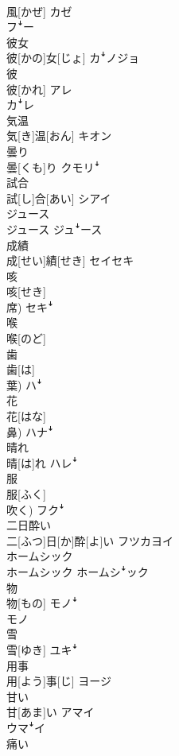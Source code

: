 \documentclass[8pt]{extreport}
\begin{document}
\begin{CJK}{UTF8}{min}
\\	風[かぜ]	カゼ 
\\	フꜜー
\\	彼女	
\\	彼[かの]女[じょ]	カꜜノジョ
\\	彼	
\\	彼[かれ]	アレ 
\\	カꜜレ
\\	気温	
\\	気[き]温[おん]	キオン
\\	曇り	
\\	曇[くも]り	クモリꜜ
\\	試合	
\\	試[し]合[あい]	シアイ
\\	ジュース	
\\	ジュース	ジュꜜース
\\	成績	
\\	成[せい]績[せき]	セイセキ
\\	咳	
\\	咳[せき] 
\\	席)	セキꜜ
\\	喉	
\\	喉[のど]	
\\	歯	
\\	歯[は] 
\\	葉)	ハꜜ
\\	花	
\\	花[はな] 
\\	鼻)	ハナꜜ
\\	晴れ	
\\	晴[は]れ	ハレꜜ
\\	服	
\\	服[ふく] 
\\	吹く)	フクꜜ
\\	二日酔い	
\\	二[ふつ]日[か]酔[よ]い	フツカヨイ
\\	ホームシック	
\\	ホームシック	ホームシꜜック
\\	物	
\\	物[もの]	モノꜜ 
\\	モノ
\\	雪	
\\	雪[ゆき]	ユキꜜ
\\	用事	
\\	用[よう]事[じ]	ヨージ
\\	甘い	
\\	甘[あま]い	アマイ 
\\	ウマꜜイ
\\	痛い	

\end{CJK}
\end{document}
